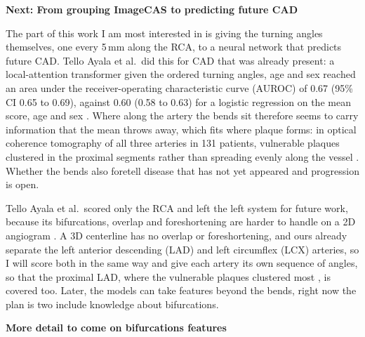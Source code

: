\medskip
\noindent \textbf{Next: From grouping ImageCAS to predicting future CAD}

\noindent The part of this work I am most interested in is giving the turning angles themselves,
one every 5\,mm along the RCA, to a neural network that predicts future CAD.
Tello Ayala et al.\ did this for CAD that was already present: a local-attention transformer given
the ordered turning angles, age and sex reached an area under the receiver-operating characteristic
curve (AUROC) of 0.67 (95\% CI 0.65 to 0.69), against 0.60 (0.58 to 0.63) for a logistic regression
on the mean score, age and sex \cite{tello2026tortuosity}.
Where along the artery the bends sit therefore seems to carry information that the mean throws away,
which fits where plaque forms: in optical coherence tomography of all three arteries in 131
patients, vulnerable plaques clustered in the proximal segments rather than spreading evenly along
the vessel \cite{araki2020plaques}.
Whether the bends also foretell disease that has not yet appeared and progression is open.


\medskip
\noindent Tello Ayala et al.\ scored only the RCA and left the left system for future work, because its
bifurcations, overlap and foreshortening are harder to handle on a 2D angiogram
\cite{tello2026tortuosity}.
A 3D centerline has no overlap or foreshortening, and ours already separate the left anterior descending
(LAD) and left circumflex (LCX) arteries, so I will score both in the same way and give each artery
its own sequence of angles, so that the proximal LAD, where the vulnerable plaques clustered most
\cite{araki2020plaques}, is covered too.
Later, the models can take features beyond the bends, right now the plan is two include knowledge about bifurcations.

\medskip
\noindent \textbf{More detail to come on bifurcations features}